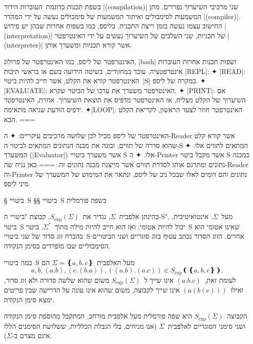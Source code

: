 בשפת תכנות כדוגמת~\CPL העוברות הידור \E|(compilation)| שני מרכיבי השיערוך
נפרדים. מתן המשמעות לסימבולים ואיתור המשמעות של סימבולים נעשה על ידי המהדר
\E|(compiler)|. החישוב עצמו נעשה בזמן ריצת התכנית. בליספ, כמו בשפות אחרות שבהן
יש פירוש \E|(interpretation)| של תכניות, שני השלבים של השיערוך נעשים על ידי
האינטרפטר \E|(interpreter)| אשר קורא תכניות ומשערך אותן.

\begin{minipage}\linewidth
\begin{mdframed}[backgroundcolor=Lavender!20]
האינטרפטר של ליספ, כמו האינטרפטר של פרולוג, \E|bash| ושפות תכנות אחרות העוברות
אינטרפטציה, עובד במחזורים, בשיטה הידועה בשם
או בראשי תיבות \E|REPL|:
✦ \E|READ|: האינטרפטר קורא את הקלט, אשר חייב להיות ביטוי~\E|S| במקרה של ליספ.
✦ \E|EVALUATE|: האינטרפטר משערך את ערכו של הביטוי שקרא.
✦ \E|PRINT|: אם השיערוך של הקלט מצליח, אז האינטרפטר מדפיס את תוצאת השיערוך.
אחרת, האינטרפטר ידפיס הודעת שגיאה מתאימה.
✦\E|LOOP|: האינטרפטר חוזר לצעד הראשון, לקריאת הקלט הבא.
===
\end{mdframed}
\end{minipage}

\normalsize

האינטרפטר של ליספ מכיל לכן שלושה מרכיבים עיקריים:
✦ ה-Reader אשר קורא קלט שהוא סדרה של תווים, ובונה את מבנה הנתונים המתאים
לביטוי ה-S המתאים לתווים אלו.
✦ המשערך (\E|Evaluator|) אשר משערך ביטויי S אלו.
✦ ה-Printer אשר מקבל ביטוי S כמבנה נתונים ומתרגם אותו לסדרת תווים אשר
מייצגת מבנה נתונים זה.
===
כאן נניח שה-Reader וה-Printer נתונים והם דומים לאלו שבכל ניב של ליספ, ונתאר את
המימוש של המשערך של מיני ליספ.

§ ביטויי~S
§§ ביטויי~S כשפה פורמלית

\newcommand\SX{\ensuremath{S_{\text{exp}}}}

בהינתן אלפבית~$Σ$, נגדיר את~$\SX(Σ)$, קבוצת "ביטויי ה-S", מעל~$Σ$.
אינטואיטיבית, ביטוי~S יכול להיות אטומי, ואז הוא חייב להיות מילה מתוך~$Σ^*$.
ביטוי~S שאינו אטומי הוא בהכרח זוג סדור של שני ביטויי~S אחרים. הזוג הסדור נכתב
עטוף בזוג סוגריים ושני הביטויים הסימבוליים שבו מופרדים בסימן הנקודה.

כמה ביטויי~S מעל האלפבית~$Σ=❴a,b,c❵$ הם \[
  a,b,(a.b),(c.(b.a)),((a.b).(a.c))∈\SX❨❴a,b,c❵❩.
\] לעומת זאת,~$(a.b.c)$ אינו שייך ל~$\SX(Σ)$ משום שהוא שלשה סדורה ולא זוג סדור,
ואילו~$(a(b(c)))$ אינו שייך לקבוצה, משום שהוא אינו עונה על הדרישה שבין פריטים
ימצא סימן הנקודה.

הקבוצה~$\SX(Σ)$ היא שפה פורמלית מעל אלפבית מורחב, המתקבל מהוספת סימן הנקודה
ושני סימני הסוגריים לאלפבית~$Σ$ (אנו מניחים, בלי הגבלת הכלליות, ששלושת הסימנים
הללו אינם מצוים ב-$Σ$).

